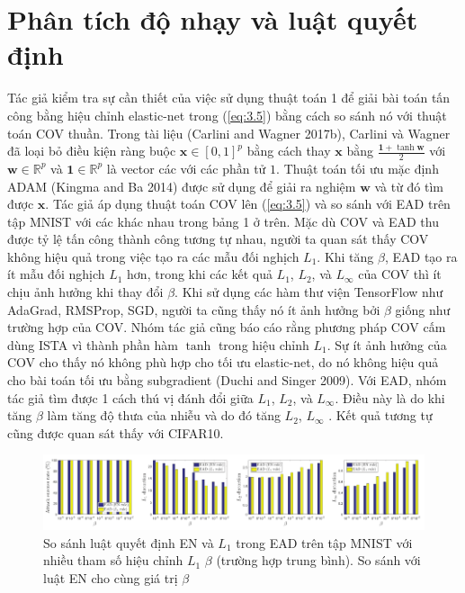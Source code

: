 \section{Phân tích độ nhạy và luật quyết định}
Tác giả kiểm tra sự cần thiết của việc sử dụng thuật toán 1 để giải bài toán tấn công bằng hiệu chỉnh elastic-net trong (\ref{eq:3.5}) bằng cách so sánh nó với thuật toán COV thuần. Trong tài liệu (Carlini and Wagner 2017b), Carlini và Wagner đã loại bỏ điều kiện ràng buộc $\mathbf{x} \in [0,1]^p$ bằng cách thay $\mathbf{x}$ bằng $\frac{\mathbf{1} + \tanh \mathbf{w}}{2}$ với $\mathbf{w} \in \mathbb{R}^p$ và $\mathbf{1} \in \mathbb{R}^p$ là vector các với các phần tử $1$. Thuật toán tối ưu mặc định ADAM (Kingma and Ba 2014) được sử dụng để giải ra nghiệm $\mathbf{w}$ và từ đó tìm được $\mathbf{x}$. Tác giả áp dụng thuật toán COV lên (\ref{eq:3.5}) và so sánh với EAD trên tập MNIST với các  khác nhau trong bảng 1 ở trên. Mặc dù COV và EAD thu được tỷ lệ tấn công thành công tương tự nhau, người ta quan sát thấy COV không hiệu quả trong việc tạo ra các mẫu đối nghịch $L_1$. Khi tăng $\beta$, EAD tạo ra ít mẫu đối nghịch $L_1$ hơn, trong khi các kết quả $L_1$, $L_2$, và $L_{\infty}$ của COV thì ít chịu ảnh hưởng khi thay đổi $\beta$. Khi sử dụng các hàm thư viện TensorFlow như AdaGrad, RMSProp, SGD, người ta cũng thấy nó ít ảnh hưởng bởi $\beta$  giống như trường hợp của COV. Nhóm tác giả cũng báo cáo rằng phương pháp COV cấm dùng ISTA vì thành phần hàm $\tanh$ trong hiệu chỉnh $L_1$. Sự ít ảnh hưởng của COV cho thấy nó không phù hợp cho tối ưu elastic-net, do nó không hiệu quả cho bài toán tối ưu bằng subgradient (Duchi and Singer 2009). Với EAD, nhóm tác giả tìm được 1 cách thú vị đánh đổi giữa $L_1$, $L_2$, và $L_{\infty}$. Điều này là do khi tăng $\beta$ làm tăng độ thưa của nhiễu và do đó tăng $L_2$, $L_{\infty}$ . Kết quả tương tự cũng được quan sát thấy với CIFAR10.
\begin{figure}[H] %
    \centering %
    \includegraphics[width=1\textwidth]{assets/fig_02.png} 
    \caption{So sánh luật quyết định EN và $L_1$ trong EAD trên tập MNIST với nhiều tham số hiệu chỉnh $L_1$ $\beta$ (trường hợp trung bình). So sánh với luật EN cho cùng giá trị $\beta$} %
    \label{fig:fg_02}
\end{figure}
